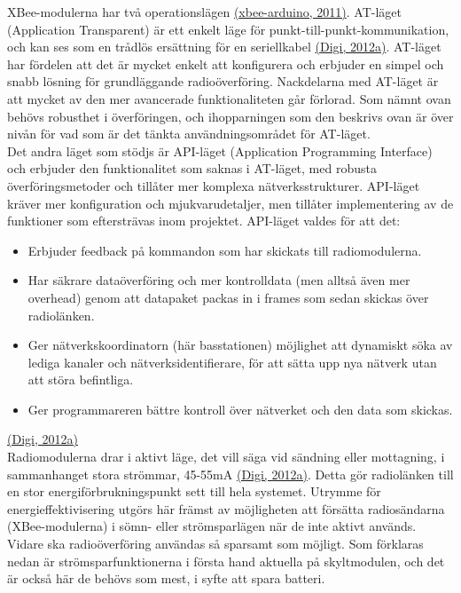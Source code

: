 \documentclass[a4paper,11pt]{article}
\begin{document}
XBee-modulerna har två operationslägen \hyperref[xbeearduino]{(xbee-arduino, 2011)}. AT-läget (Application Transparent) är ett enkelt läge för punkt-till-punkt-kommunikation, och kan ses som en trådlös ersättning för en seriellkabel \hyperref[digi]{(Digi, 2012a)}. AT-läget har fördelen att det är mycket enkelt att konfigurera och erbjuder en simpel och snabb lösning för grundläggande radioöverföring. Nackdelarna med AT-läget är att mycket av den mer avancerade funktionaliteten går förlorad. Som nämnt ovan behövs robusthet i överföringen, och ihopparningen som den beskrivs ovan är över nivån för vad som är det tänkta användningsområdet för AT-läget. \\

Det andra läget som stödjs är API-läget (Application Programming Interface) och erbjuder den funktionalitet som saknas i AT-läget, med robusta överföringsmetoder och tillåter mer komplexa nätverksstrukturer. API-läget kräver mer konfiguration och mjukvarudetaljer, men tillåter implementering av de funktioner som eftersträvas inom projektet. API-läget valdes för att det:
	
	\begin{itemize}
	\item Erbjuder feedback på kommandon som har skickats till radiomodulerna.
    	\item Har säkrare dataöverföring och mer kontrolldata (men alltså även mer overhead) genom att datapaket packas in i frames som sedan skickas över radiolänken.
    	\item Ger nätverkskoordinatorn (här basstationen) möjlighet att dynamiskt söka av lediga kanaler och nätverksidentifierare, för att sätta upp nya nätverk utan att störa befintliga.
    	\item Ger programmareren bättre kontroll över nätverket och den data som skickas.
    	\end{itemize}
\hyperref[digi]{(Digi, 2012a)}\\
    	
Radiomodulerna drar i aktivt läge, det vill säga vid sändning eller mottagning, i sammanhanget stora strömmar, 45-55mA \hyperref[digi]{(Digi, 2012a)}. Detta gör radiolänken till en stor energiförbrukningspunkt sett till hela systemet. Utrymme för energieffektivisering utgörs här främst av möjligheten att försätta radiosändarna (XBee-modulerna) i sömn- eller strömsparlägen när de inte aktivt används. Vidare ska radioöverföring användas så sparsamt som möjligt. Som förklaras nedan är strömsparfunktionerna i första hand aktuella på skyltmodulen, och det är också här de behövs som mest, i syfte att spara batteri. \\
\end{document}
